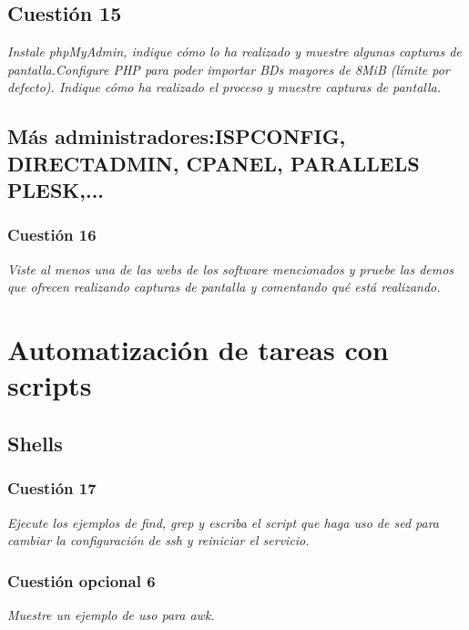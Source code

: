 \subsection{Cuestión 15}
\textit{Instale phpMyAdmin, indique cómo lo ha realizado y muestre algunas capturas de pantalla.Configure PHP para poder importar BDs mayores de 8MiB (límite por defecto). Indique cómo ha realizado el proceso y muestre capturas de pantalla.}


\subsection{Más administradores:ISPCONFIG, DIRECTADMIN, CPANEL, PARALLELS PLESK,... }
\subsubsection{Cuestión 16}
\textit{Viste al menos una de las webs de los software mencionados y pruebe las demos que ofrecen realizando capturas de pantalla y comentando qué está realizando.}


\section{Automatización de tareas con scripts}
\subsection{Shells}
\subsubsection{Cuestión 17}
\textit{Ejecute los ejemplos de find, grep y escriba el script que haga uso de sed para cambiar la configuración de ssh y reiniciar el servicio.}

\subsubsection{Cuestión opcional 6}
\textit{Muestre un ejemplo de uso para awk.}


